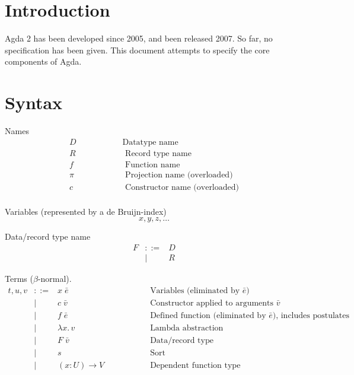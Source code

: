 \documentclass[acmlarge]{acmart}\settopmatter{}
\renewcommand{\|}{\mid}
\begin{document}
\section{Introduction}

Agda 2 has been developed since 2005, and been released 2007.  So far,
no specification has been given.  This document attempts to specify
the core components of Agda.


\section{Syntax}
\label{sec:syntax}

\newcommand{\bang}{\,!\,}
\newcommand{\twobang}{\,!!\,}


Names
\[
\begin{array}{ll}
D   & \hspace{2cm}\text{Datatype name} \\
  R & \hspace{2cm}\text{   Record type name} \\
  f & \hspace{2cm}\text{   Function name} \\
\pi & \hspace{2cm}\text{  Projection name  (overloaded)} \\
  c & \hspace{2cm}\text{   Constructor name (overloaded)} \\
\end{array}
\]

Variables (represented by a de Bruijn-index)
\[
x,y,z, \hdots
\]

Data/record type name
\[
\begin{array}{lrl}
F &::= & D \\& |& R
\end{array}
\]

Terms ($\beta$-normal).
\[
\begin{array}{lrll}
t, u, v &::=& x\; \bar{e}            & \hspace{2cm}\text{Variables (eliminated by $\bar{e}$)} \\
          &|& c\; \bar{v}            & \hspace{2cm}\text{Constructor applied to arguments $\bar{v}$} \\
          &|& f\; \bar{e}            & \hspace{2cm}\text{Defined function (eliminated by $\bar{e}$), includes postulates} \\
          &|& \lambda x.\, v           & \hspace{2cm}\text{Lambda abstraction} \\
          &|& F\; \bar{v}            & \hspace{2cm}\text{Data/record type} \\
          &|& s               & \hspace{2cm}\text{Sort} \\
          &|& (x : U) \rightarrow V      & \hspace{2cm}\text{Dependent function type} \\
\end{array}
\]
\end{document}
